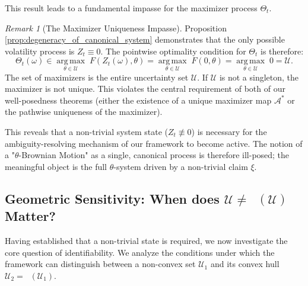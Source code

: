 \documentclass[12pt, letterpaper]{amsart}
\newcommand{\Thetacal}{\mathcal{A}}
\newcommand{\Ucal}{\mathcal{U}}
\DeclareMathOperator*{\argmax}{arg\,max}
\DeclareMathOperator*{\overlineconv}{\overline{conv}}
\theoremstyle{plain}
\theoremstyle{definition}
\theoremstyle{remark}
\newtheorem{remark}[theorem]{Remark}
\numberwithin{equation}{section} %
\begin{document}
This result leads to a fundamental impasse for the maximizer process $\Theta_t$.

\begin{remark}[The Maximizer Uniqueness Impasse]
\label{rem:maximizer_impasse}
Proposition \ref{prop:degeneracy_of_canonical_system} demonstrates that the only possible volatility process is $Z_t \equiv 0$. The pointwise optimality condition for $\Theta_t$ is therefore:
\[ \Theta_t(\omega) \in \underset{\theta \in \Ucal}{\argmax} \; F(Z_t(\omega), \theta) = \underset{\theta \in \Ucal}{\argmax} \; F(0, \theta) = \underset{\theta \in \Ucal}{\argmax} \; 0 = \Ucal. \]
The set of maximizers is the entire uncertainty set $\Ucal$. If $\Ucal$ is not a singleton, the maximizer is not unique. This violates the central requirement of both of our well-posedness theorems (either the existence of a unique maximizer map $\Thetacal^*$ or the pathwise uniqueness of the maximizer).

This reveals that a non-trivial system state ($Z_t \not\equiv 0$) is necessary for the ambiguity-resolving mechanism of our framework to become active. The notion of a "$\theta$-Brownian Motion" as a single, canonical process is therefore ill-posed; the meaningful object is the full $\theta$-system driven by a non-trivial claim $\xi$.
\end{remark}

\subsection{Geometric Sensitivity: When does \texorpdfstring{$\Ucal \neq \overlineconv(\Ucal)$}{Ucal != conv(Ucal)} Matter?}
Having established that a non-trivial state is required, we now investigate the core question of identifiability. We analyze the conditions under which the framework can distinguish between a non-convex set $\Ucal_1$ and its convex hull $\Ucal_2 = \overlineconv(\Ucal_1)$.
\end{document}

